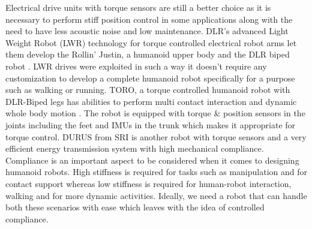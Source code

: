 Electrical drive units with torque sensors are still a better choice as it is necessary to perform stiff position control in some applications along with the need to have less acoustic noise and low maintenance. DLR's advanced Light Weight Robot (LWR) technology \cite{hirzinger2002dlr} for torque controlled electrical robot arms let them develop the Rollin' Justin, a humanoid upper body and the DLR biped robot \cite{ott2010development}. LWR drives were exploited in such a way it doesn't require any customization to develop a complete humanoid robot specifically for a purpose such as walking or running. TORO, a torque controlled humanoid robot with DLR-Biped legs has abilities to perform multi contact interaction and dynamic whole body motion \cite{englsberger2014overview}. The robot is equipped with torque \& position sensors in the joints including the feet and IMUs in the trunk which makes it appropriate for torque control. DURUS from SRI \cite{hereid20163d} is another robot with torque sensors and a very efficient energy transmission system with high mechanical compliance. Compliance is an important aspect to be considered when it comes to designing humanoid robots. High stiffness is required for tasks such as manipulation and for contact support whereas low stiffness is required for human-robot interaction, walking and for more dynamic activities. Ideally, we need a robot that can handle both these scenarios with ease which leaves with the idea of controlled compliance. 
